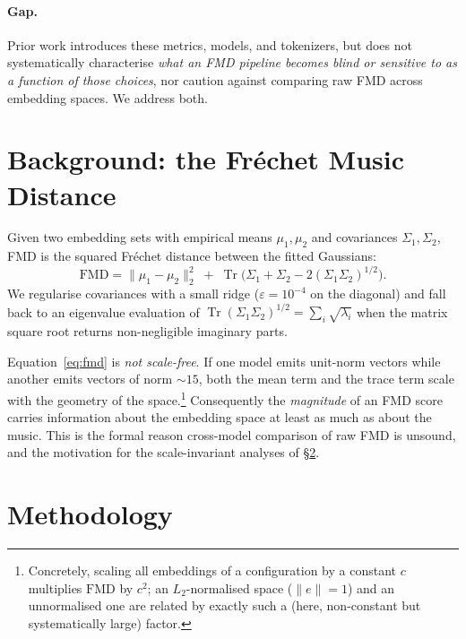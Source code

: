 \documentclass[11pt]{article}
\newcommand{\fmd}{\mathrm{FMD}}
\begin{document}
\paragraph{Gap.}
Prior work introduces these metrics, models, and tokenizers, but does not
systematically characterise \emph{what an FMD pipeline becomes blind or
sensitive to as a function of those choices}, nor caution against comparing
raw FMD across embedding spaces. We address both.

\section{Background: the Fr\'echet Music Distance}
\label{sec:background}
Given two embedding sets with empirical means $\mu_1,\mu_2$ and covariances
$\Sigma_1,\Sigma_2$, FMD is the squared Fr\'echet distance between the
fitted Gaussians:
\begin{equation}
\fmd = \lVert \mu_1-\mu_2\rVert_2^2 \;+\;
\operatorname{Tr}\!\Big(\Sigma_1+\Sigma_2-2(\Sigma_1\Sigma_2)^{1/2}\Big).
\label{eq:fmd}
\end{equation}
We regularise covariances with a small ridge ($\varepsilon=10^{-4}$ on the
diagonal) and fall back to an eigenvalue evaluation of
$\operatorname{Tr}(\Sigma_1\Sigma_2)^{1/2}=\sum_i\sqrt{\lambda_i}$ when the
matrix square root returns non-negligible imaginary parts.

Equation~\eqref{eq:fmd} is \emph{not scale-free}. If one model emits
unit-norm vectors while another emits vectors of norm $\sim\!15$, both the
mean term and the trace term scale with the geometry of the
space.\footnote{Concretely, scaling all embeddings of a configuration by a
constant $c$ multiplies $\fmd$ by $c^2$; an $L_2$-normalised space ($\lVert
e\rVert=1$) and an unnormalised one are related by exactly such a (here,
non-constant but systematically large) factor.} Consequently the
\emph{magnitude} of an FMD score carries information about the embedding
space at least as much as about the music. This is the formal reason
cross-model comparison of raw FMD is unsound, and the motivation for the
scale-invariant analyses of \S\ref{sec:method}.

\section{Methodology}
\label{sec:method}
\end{document}
